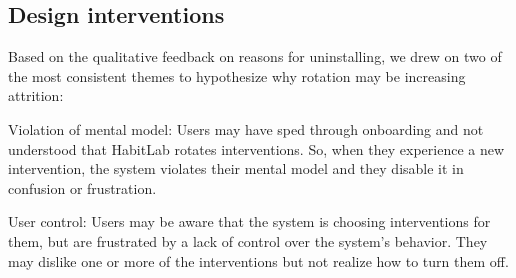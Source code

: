 \subsection{Design interventions}

Based on the qualitative feedback on reasons for uninstalling, we drew on two of the most consistent themes to hypothesize why rotation may be increasing attrition:

\begin{hyp} \label{hyp:mentalmodel}
Violation of mental model: Users may have sped through onboarding and not understood that HabitLab rotates interventions. So, when they experience a new intervention, the system violates their mental model and they disable it in confusion or frustration.
\end{hyp}

\begin{hyp} \label{hyp:control}
User control: Users may be aware that the system is choosing interventions for them, but are frustrated by a lack of control over the system's behavior. They may dislike one or more of the interventions but not realize how to turn them off.
\end{hyp}


